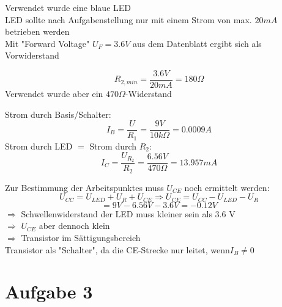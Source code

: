 \documentclass[compress,11pt]{beamer}
\begin{document}
\begin{frame}

Verwendet wurde eine blaue LED\\
LED sollte nach Aufgabenstellung nur mit einem Strom von max. $20 mA$ betrieben werden\\
Mit "Forward Voltage" $U_F = 3.6 V$ aus dem Datenblatt ergibt sich als Vorwiderstand

\begin{equation}
R_{2,min} = \frac{3.6 V}{20 mA} = 180 \Omega
\end{equation}
Verwendet wurde aber ein $470 \Omega$-Widerstand

\end{frame}
\begin{frame}
Strom durch Basis/Schalter:
\begin{equation}
I_B = \frac{U}{R_1} = \frac{9 V}{10 k\Omega} = 0.0009 A
\end{equation}
Strom durch LED $=$ Strom durch $R_2$:
\begin{equation}
I_C = \frac{U_{R_2}}{R_2} = \frac{6.56 V}{470 \Omega} = 13.957 mA
\end{equation}
\end{frame}
\begin{frame}
Zur Bestimmung der Arbeitspunktes muss $U_{CE}$ noch ermittelt werden:
\begin{equation}
U_{CC} = U_{LED} + U_R + U_{CE} \Rightarrow U_{CE} = U_{CC} - U_{LED} - U_R
\end{equation}
\begin{equation}
= 9 V - 6.56 V -3.6 V = -0.12 V
\end{equation}
$\Rightarrow$ Schwellenwiderstand der LED muss kleiner sein als 3.6 V \\ $\Rightarrow$ $U_{CE}$ aber dennoch klein \\ $\Rightarrow$ Transistor im Sättigungsbereich\\
Transistor als "Schalter", da die CE-Strecke nur leitet, wenn$I_B \neq 0$
\end{frame}








\section{Aufgabe 3}
\end{document}
